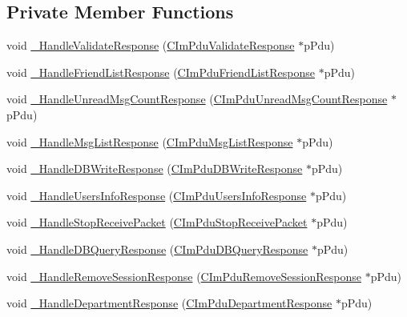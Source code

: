\subsection*{Private Member Functions}
\begin{DoxyCompactItemize}
\item 
void \hyperlink{class_c_d_b_serv_conn_a8079b9449bd108fdfbfb854e3af4db2b}{\+\_\+\+Handle\+Validate\+Response} (\hyperlink{class_c_im_pdu_validate_response}{C\+Im\+Pdu\+Validate\+Response} $\ast$p\+Pdu)
\item 
void \hyperlink{class_c_d_b_serv_conn_a61f23ebd7aed37c7bbadaada3d288c7c}{\+\_\+\+Handle\+Friend\+List\+Response} (\hyperlink{class_c_im_pdu_friend_list_response}{C\+Im\+Pdu\+Friend\+List\+Response} $\ast$p\+Pdu)
\item 
void \hyperlink{class_c_d_b_serv_conn_a429cff62fab59565acf20d2295ed275e}{\+\_\+\+Handle\+Unread\+Msg\+Count\+Response} (\hyperlink{class_c_im_pdu_unread_msg_count_response}{C\+Im\+Pdu\+Unread\+Msg\+Count\+Response} $\ast$p\+Pdu)
\item 
void \hyperlink{class_c_d_b_serv_conn_a3527ec8c0a07f72818960d493580d258}{\+\_\+\+Handle\+Msg\+List\+Response} (\hyperlink{class_c_im_pdu_msg_list_response}{C\+Im\+Pdu\+Msg\+List\+Response} $\ast$p\+Pdu)
\item 
void \hyperlink{class_c_d_b_serv_conn_ad5837d7ec3c2cda3088127e3b190dafa}{\+\_\+\+Handle\+D\+B\+Write\+Response} (\hyperlink{class_c_im_pdu_d_b_write_response}{C\+Im\+Pdu\+D\+B\+Write\+Response} $\ast$p\+Pdu)
\item 
void \hyperlink{class_c_d_b_serv_conn_a8fd78e20841557c927615b74894d5cd6}{\+\_\+\+Handle\+Users\+Info\+Response} (\hyperlink{class_c_im_pdu_users_info_response}{C\+Im\+Pdu\+Users\+Info\+Response} $\ast$p\+Pdu)
\item 
void \hyperlink{class_c_d_b_serv_conn_abd88d034aba3f01e9fb4f3a8ec478bef}{\+\_\+\+Handle\+Stop\+Receive\+Packet} (\hyperlink{class_c_im_pdu_stop_receive_packet}{C\+Im\+Pdu\+Stop\+Receive\+Packet} $\ast$p\+Pdu)
\item 
void \hyperlink{class_c_d_b_serv_conn_aa056c44c3776453967c638bdc780330a}{\+\_\+\+Handle\+D\+B\+Query\+Response} (\hyperlink{class_c_im_pdu_d_b_query_response}{C\+Im\+Pdu\+D\+B\+Query\+Response} $\ast$p\+Pdu)
\item 
void \hyperlink{class_c_d_b_serv_conn_aea86c5b301364224e47732f7fa4bbd52}{\+\_\+\+Handle\+Remove\+Session\+Response} (\hyperlink{class_c_im_pdu_remove_session_response}{C\+Im\+Pdu\+Remove\+Session\+Response} $\ast$p\+Pdu)
\item 
void \hyperlink{class_c_d_b_serv_conn_a099c4314780a08db71bcf2af1584f7ae}{\+\_\+\+Handle\+Department\+Response} (\hyperlink{class_c_im_pdu_department_response}{C\+Im\+Pdu\+Department\+Response} $\ast$p\+Pdu)
\end{DoxyCompactItemize}
